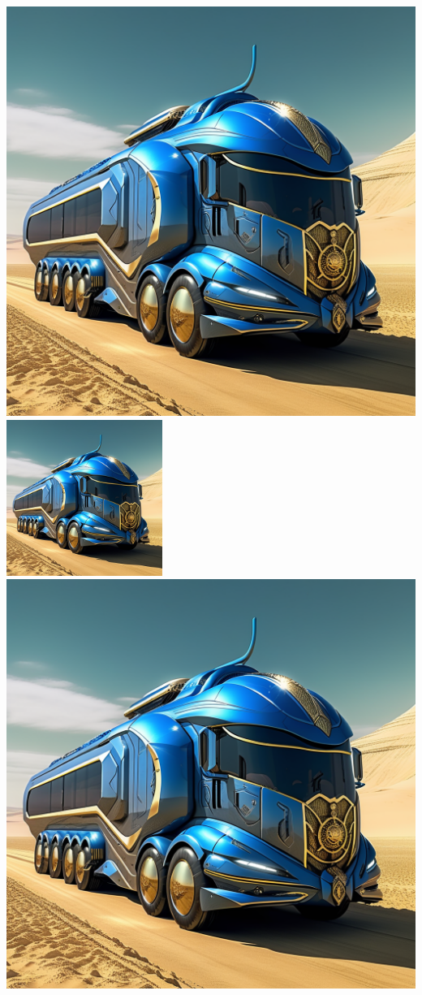 \documentclass[11pt]{article}
\begin{document}
\includegraphics[scale=0.2]{armored_motorhome.png}
\includegraphics[width=2in]{armored_motorhome.png}\\
\includegraphics[width=.5\textwidth]{armored_motorhome.png}\\
\end{document}
